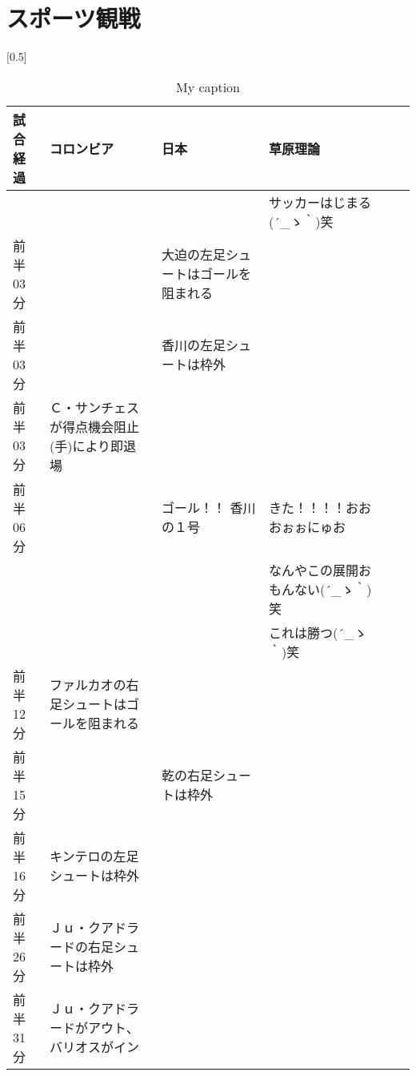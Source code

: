 \section{スポーツ観戦}

\begin{table}[htb]
  \centering
  \caption{My caption}
  \label{my-label}
  \scalebox{0.5}[0.5]{
    \begin{tabular}{|l|l|l|l|l|l|} \hline
      試合経過  & コロンビア                                   & 日本                                 & 草原理論  \\ \hline \hline
                &                                              &                                       & サッカーはじまる\sf(´\_ゝ｀)笑 \\ \hline \hline
      前半03分  &                                              & 大迫の左足シュートはゴールを阻まれる  &                                  \\ \hline
      前半03分  &                                              & 香川の左足シュートは枠外              &                                  \\ \hline
      前半03分  & Ｃ・サンチェスが得点機会阻止(手)により即退場 &                                       &                                   \\ \hline
      前半06分  &                                              & ゴール！！ 香川の１号                 & きた！！！！おおおぉぉにゅお  \\ \hline
                &                                              &                                       & なんやこの展開おもんない\sf (´\_ゝ｀)笑\\ \hline
                &                                              &                                       & これは勝つ\sf (´\_ゝ｀)笑\\ \hline
      前半12分  & ファルカオの右足シュートはゴールを阻まれる   &                                       &   \\ \hline
      前半15分  &                                              & 乾の右足シュートは枠外                &    \\ \hline
      前半16分  & キンテロの左足シュートは枠外                 &                                       & \\ \hline
      前半26分  & Ｊｕ・クアドラードの右足シュートは枠外       &                                       & \\ \hline
      前半31分  & Ｊｕ・クアドラードがアウト、バリオスがイン   &                                       & \\ \hline

\end{tabular}}
\end{table}
